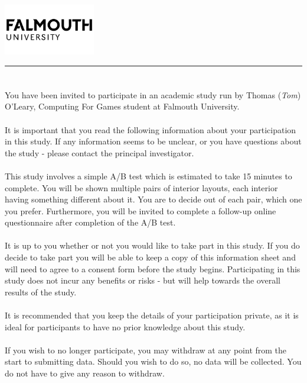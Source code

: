 \documentclass{article}
\begin{document}
\includegraphics[width=0.3\textwidth]{falmouth-university-vector-logo.png}
\vspace{-1em}

\rule{\linewidth}{1pt}
\bigskip

\section*{}
You have been invited to participate in an academic study run by Thomas (\textit{Tom}) O’Leary, Computing For Games student at Falmouth University.
\\
\\
It is important that you read the following information about your participation in this study.
If any information seems to be unclear, or you have questions about the study - please contact the principal investigator.
\\
\\
This study involves a simple A/B test which is estimated to take 15 minutes to complete. 
You will be shown multiple pairs of interior layouts, each interior having something different 
about it. 
You are to decide out of each pair, which one you prefer. 
Furthermore, you will be invited to complete a follow-up online questionnaire after completion of the A/B test.
\\
\\
It is up to you whether or not you would like to take part in this study. 
If you do decide to take part you will be able to keep a copy of this information sheet 
and will need to agree to a consent form before the study begins.
Participating in this study does not incur any benefits or risks - but will help towards the overall results of the study.
\\
\\
It is recommended that you keep the details of your participation private, as it is ideal for participants to have no prior knowledge about this study.
\\
\\
If you wish to no longer participate, you may withdraw at any point from the start to submitting data. Should you wish to do so, no data will be collected. You do not have to give any reason to withdraw.
\bigskip
\end{document}
